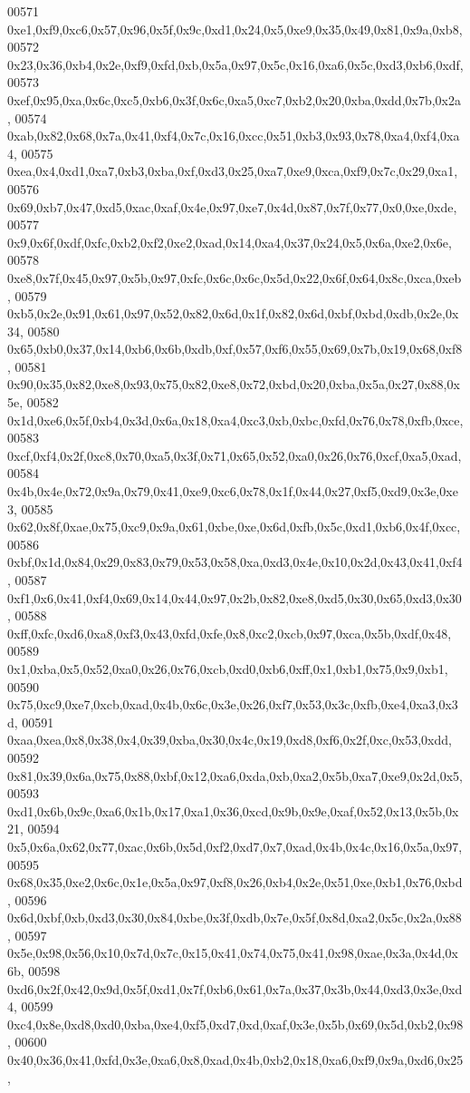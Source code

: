 \begin{DoxyCode}
00571   0xe1,0xf9,0xc6,0x57,0x96,0x5f,0x9c,0xd1,0x24,0x5,0xe9,0x35,0x49,0x81,0x9a,0xb8,
00572   0x23,0x36,0xb4,0x2e,0xf9,0xfd,0xb,0x5a,0x97,0x5c,0x16,0xa6,0x5c,0xd3,0xb6,0xdf,
00573   0xef,0x95,0xa,0x6c,0xc5,0xb6,0x3f,0x6c,0xa5,0xc7,0xb2,0x20,0xba,0xdd,0x7b,0x2a,
00574   0xab,0x82,0x68,0x7a,0x41,0xf4,0x7c,0x16,0xcc,0x51,0xb3,0x93,0x78,0xa4,0xf4,0xa4,
00575   0xea,0x4,0xd1,0xa7,0xb3,0xba,0xf,0xd3,0x25,0xa7,0xe9,0xca,0xf9,0x7c,0x29,0xa1,
00576   0x69,0xb7,0x47,0xd5,0xac,0xaf,0x4e,0x97,0xe7,0x4d,0x87,0x7f,0x77,0x0,0xe,0xde,
00577   0x9,0x6f,0xdf,0xfc,0xb2,0xf2,0xe2,0xad,0x14,0xa4,0x37,0x24,0x5,0x6a,0xe2,0x6e,
00578   0xe8,0x7f,0x45,0x97,0x5b,0x97,0xfc,0x6c,0x6c,0x5d,0x22,0x6f,0x64,0x8c,0xca,0xeb,
00579   0xb5,0x2e,0x91,0x61,0x97,0x52,0x82,0x6d,0x1f,0x82,0x6d,0xbf,0xbd,0xdb,0x2e,0x34,
00580   0x65,0xb0,0x37,0x14,0xb6,0x6b,0xdb,0xf,0x57,0xf6,0x55,0x69,0x7b,0x19,0x68,0xf8,
00581   0x90,0x35,0x82,0xe8,0x93,0x75,0x82,0xe8,0x72,0xbd,0x20,0xba,0x5a,0x27,0x88,0x5e,
00582   0x1d,0xe6,0x5f,0xb4,0x3d,0x6a,0x18,0xa4,0xc3,0xb,0xbc,0xfd,0x76,0x78,0xfb,0xce,
00583   0xcf,0xf4,0x2f,0xc8,0x70,0xa5,0x3f,0x71,0x65,0x52,0xa0,0x26,0x76,0xcf,0xa5,0xad,
00584   0x4b,0x4e,0x72,0x9a,0x79,0x41,0xe9,0xc6,0x78,0x1f,0x44,0x27,0xf5,0xd9,0x3e,0xe3,
00585   0x62,0x8f,0xae,0x75,0xc9,0x9a,0x61,0xbe,0xe,0x6d,0xfb,0x5c,0xd1,0xb6,0x4f,0xcc,
00586   0xbf,0x1d,0x84,0x29,0x83,0x79,0x53,0x58,0xa,0xd3,0x4e,0x10,0x2d,0x43,0x41,0xf4,
00587   0xf1,0x6,0x41,0xf4,0x69,0x14,0x44,0x97,0x2b,0x82,0xe8,0xd5,0x30,0x65,0xd3,0x30,
00588   0xff,0xfc,0xd6,0xa8,0xf3,0x43,0xfd,0xfe,0x8,0xc2,0xcb,0x97,0xca,0x5b,0xdf,0x48,
00589   0x1,0xba,0x5,0x52,0xa0,0x26,0x76,0xcb,0xd0,0xb6,0xff,0x1,0xb1,0x75,0x9,0xb1,
00590   0x75,0xc9,0xe7,0xcb,0xad,0x4b,0x6c,0x3e,0x26,0xf7,0x53,0x3c,0xfb,0xe4,0xa3,0x3d,
00591   0xaa,0xea,0x8,0x38,0x4,0x39,0xba,0x30,0x4c,0x19,0xd8,0xf6,0x2f,0xc,0x53,0xdd,
00592   0x81,0x39,0x6a,0x75,0x88,0xbf,0x12,0xa6,0xda,0xb,0xa2,0x5b,0xa7,0xe9,0x2d,0x5,
00593   0xd1,0x6b,0x9c,0xa6,0x1b,0x17,0xa1,0x36,0xcd,0x9b,0x9e,0xaf,0x52,0x13,0x5b,0x21,
00594   0x5,0x6a,0x62,0x77,0xac,0x6b,0x5d,0xf2,0xd7,0x7,0xad,0x4b,0x4c,0x16,0x5a,0x97,
00595   0x68,0x35,0xe2,0x6c,0x1e,0x5a,0x97,0xf8,0x26,0xb4,0x2e,0x51,0xe,0xb1,0x76,0xbd,
00596   0x6d,0xbf,0xb,0xd3,0x30,0x84,0xbe,0x3f,0xdb,0x7e,0x5f,0x8d,0xa2,0x5c,0x2a,0x88,
00597   0x5e,0x98,0x56,0x10,0x7d,0x7c,0x15,0x41,0x74,0x75,0x41,0x98,0xae,0x3a,0x4d,0x6b,
00598   0xd6,0x2f,0x42,0x9d,0x5f,0xd1,0x7f,0xb6,0x61,0x7a,0x37,0x3b,0x44,0xd3,0x3e,0xd4,
00599   0xc4,0x8e,0xd8,0xd0,0xba,0xe4,0xf5,0xd7,0xd,0xaf,0x3e,0x5b,0x69,0x5d,0xb2,0x98,
00600   0x40,0x36,0x41,0xfd,0x3e,0xa6,0x8,0xad,0x4b,0xb2,0x18,0xa6,0xf9,0x9a,0xd6,0x25,

\end{DoxyCode}
